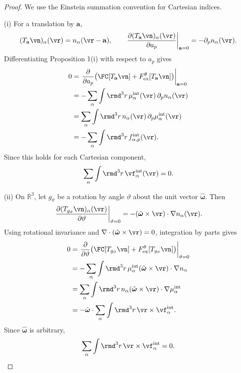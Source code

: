 \begin{proof}
We use the Einstein summation convention for Cartesian indices.

(i) For a translation by $\mathbf a$,
\[
(T_{\mathbf a}\vn)_\alpha(\vr)=n_\alpha(\vr-\mathbf a),
\qquad
\left.
\frac{\partial(T_{\mathbf a}\vn)_\alpha(\vr)}
     {\partial a_p}
\right|_{\mathbf a=0}
=-\partial_p n_\alpha(\vr).
\]
Differentiating Proposition 1(i) with respect to $a_p$ gives
\[
\begin{aligned}
0
&=
\left.
\frac{\partial}{\partial a_p}
\big(\FC[T_{\mathbf a}\vn]
+F^\theta_{\rm ex}[T_{\mathbf a}\vn]\big)
\right|_{\mathbf a=0}\\
&=
-\sum_\alpha\int\rmd^3r\,
\mu^{\rm int}_\alpha(\vr)\,\partial_p n_\alpha(\vr)\\
&=
\sum_\alpha\int\rmd^3r\,
n_\alpha(\vr)\,\partial_p\mu^{\rm int}_\alpha(\vr)\\
&=
-\sum_\alpha\int\rmd^3r\,f^{\rm int}_{\alpha,p}(\vr).
\end{aligned}
\]
Since this holds for each Cartesian component,
\[
\sum_\alpha\int\rmd^3r\,\vf^{\rm int}_\alpha(\vr)=0.
\]

(ii) On $\mathbb R^3$, let $g_\vartheta$ be a rotation by
angle $\vartheta$ about the unit vector
$\hat{\boldsymbol\omega}$. Then
\[
\left.
\frac{\partial(T_{g_\vartheta}\vn)_\alpha(\vr)}
     {\partial\vartheta}
\right|_{\vartheta=0}
=
-(\hat{\boldsymbol\omega}\times\vr)\cdot
\nabla n_\alpha(\vr).
\]
Using rotational invariance and
$\nabla\cdot(\hat{\boldsymbol\omega}\times\vr)=0$,
integration by parts gives
\[
\begin{aligned}
0
&=
\left.
\frac{\partial}{\partial\vartheta}
\big(\FC[T_{g_\vartheta}\vn]
+F^\theta_{\rm ex}[T_{g_\vartheta}\vn]\big)
\right|_{\vartheta=0}\\
&=
-\sum_\alpha\int\rmd^3r\,
\mu^{\rm int}_\alpha
(\hat{\boldsymbol\omega}\times\vr)\cdot\nabla n_\alpha\\
&=
\sum_\alpha\int\rmd^3r\,
n_\alpha(\hat{\boldsymbol\omega}\times\vr)
\cdot\nabla\mu^{\rm int}_\alpha\\
&=
-\hat{\boldsymbol\omega}\cdot
\sum_\alpha\int\rmd^3r\,
\vr\times\vf^{\rm int}_\alpha.
\end{aligned}
\]
Since $\hat{\boldsymbol\omega}$ is arbitrary,
\[
\sum_\alpha\int\rmd^3r\,
\vr\times\vf^{\rm int}_\alpha=0.
\]
\end{proof}


